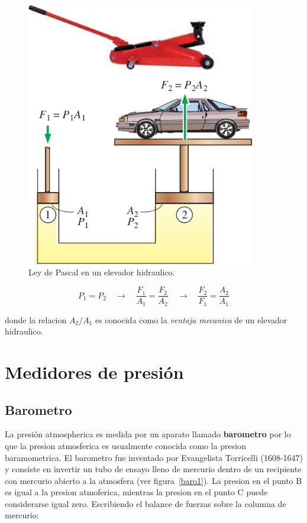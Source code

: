 \documentclass[10pt, oneside]{article}
\begin{document}
\begin{figure}[h]
\centering
\includegraphics[width=10cm]{pres4}
\caption{Ley de Pascal en un elevador hidraulico.}
\label{pres4}
\end{figure}

\begin{equation}
P_1 = P_2 \quad \rightarrow \quad \frac{F_1}{A_1}=\frac{F_2}{A_2} \quad \rightarrow \quad \frac{F_2}{F_1}=\frac{A_2}{A_1}
\label{ppr6}
\end{equation}

donde la relacion $A_2 / A_1$ es conocida como la \textit{ventaja mecanica} de un elevador hidraulico.

\section{Medidores de presi\'on}
\subsection{Barometro}
La presi\'on atmospherica es medida por un aparato llamado \textbf{barometro} por lo que la presion atmosferica es usualmente conocida como la presion baramometrica. El barometro fue inventado por Evangelista Torricelli (1608-1647) y consiste en invertir un tubo de ensayo lleno de mercurio dentro de un recipiente con mercurio abierto a la atmosfera (ver figura~\ref{baro1}). La presion en el punto B es igual a la presion atmoferica, mientras la presion en el punto C puede considerarse igual zero. Escribiendo el balance de fuerzas sobre la columna de mercurio:
\end{document}

